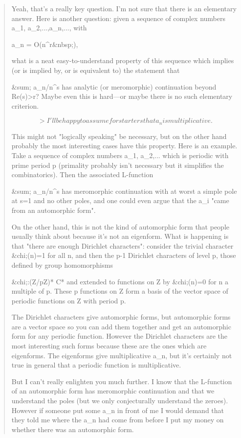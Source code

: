 \begin{quote}
 Yeah, that's a really key question. I'm not sure that there is an elementary
 answer.  Here is another question: given a sequence of complex numbers
 a_{1}, a_{2},...,a_{n},..., with 

a_{n} =
 O(n^{r&nbsp;}), 

 what is a neat easy-to-understand
 property of this sequence which implies (or is implied by, or is equivalent 
 to) the statement that 

&sum; a_{n}/n^{s} 
has analytic (or meromorphic) continuation
 beyond Re(s)>r?  Maybe even this is hard---or maybe there is no such
 elementary criterion.


$$

 > I'll be happy to assume for starters that a_{n} is multiplicative.
$$
    

 This might not "logically speaking" be necessary, but on the other hand
 probably the most interesting cases have this property. Here is an
 example. Take a sequence of complex numbers a_{1}, 
 a_{2},... which
 is periodic with prime period p (primality probably isn't necessary but it
 simplifies the combinatorics). Then the associated L-function

 &sum; a_{n}/n^{s}
 has
 meromorphic continuation with at worst a simple pole at s=1 and no
 other poles, and one could even argue that the a_{i} "came from an
 automorphic form".

 On the other hand, this is not the kind of automorphic form that
 people usually think about because it's not an eigenform. What is
 happening is that "there are enough Dirichlet characters": consider
 the trivial character &chi;(n)=1 for all n, and then the p-1 Dirichlet
 characters of level p, those defined by group homomorphisms 

&chi;:(Z/pZ)* \to  C*
 and extended to functions on Z by &chi;(n)=0 for n a multiple of p.
 These p functions on Z form a basis of the vector space of periodic functions
 on Z with period p.

 The Dirichlet characters give automorphic forms, but automorphic
 forms are a vector space so you can add them together and get
 an automorphic form for any periodic function. However the Dirichlet
 characters are the most interesting such forms because these are the ones
 which are eigenforms. The eigenforms give multiplicative a_{n}, but
 it's certainly not true in general that a periodic function is 
 multiplicative.
 
 But I can't really enlighten you much further. I know that the
 L-function of an automorphic form has meromorphic continuation
 and that we understand the poles (but we only conjecturally understand
 the zeroes). However if someone put some a_{n} in front of me I would
 demand that they told me where the a_{n} had come from before I put
 my money on whether there was an automorphic form.
 

\end{quote}
